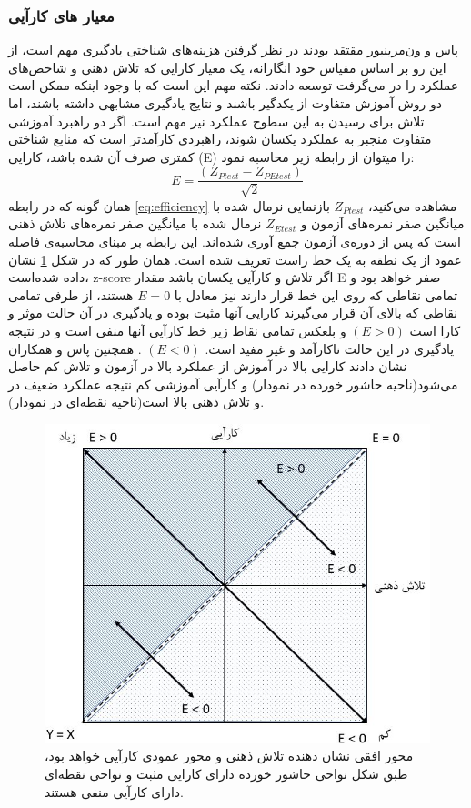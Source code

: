 \subsubsection{معیار های کارآیی}
پاس و ون‌مرینبور مقتقد بودند در نظر گرفتن هزینه‌های شناختی یادگیری مهم است، از این رو بر اساس مقیاس خود انگارانه، یک معیار کارایی که تلاش ذهنی و شاخص‌های عملکرد را در می‌گرفت توسعه دادند. نکته مهم این است که با وجود اینکه ممکن است دو روش آموزش متفاوت از یکدگیر باشند و نتایج یادگیری مشابهی داشته باشند، اما تلاش برای رسیدن به این سطوح عملکرد نیز مهم است. اگر دو راهبرد آموزشی متفاوت منجبر به عملکرد یکسان شوند، راهبردی کارآمدتر است که منابع شناختی کمتری صرف آن شده باشد، کارایی (E) را میتوان از رابطه زیر محاسبه نمود:
\begin{equation}\label{eq:efficiency}
E = \frac{(Z_{Ptest}-Z_{PEtest})}{\sqrt{2}}
\end{equation}
همان گونه که در رابطه 
\eqref{eq:efficiency}
مشاهده می‌کنید،
$ Z_{Ptest} $
بازنمایی نرمال شده با میانگین صفر
نمره‌های آزمون و 
$ Z_{Etest} $
نرمال شده با میانگین صفر نمره‌های تلاش ذهنی است که پس از دوره‌ی آزمون جمع آوری شده‌اند. این رابطه بر مبنای محاسبه‌ی فاصله عمود از یک نطقه به یک خط راست تعریف شده است. همان طور که در شکل 
\ref{fig:efficiency}
نشان داده شده‌است،
z-score
اگر تلاش و کارآیی یکسان باشد مقدار E صفر خواهد بود و تمامی نقاطی که روی این خط قرار دارند نیز معادل با 
$ E = 0 $
هستند، از طرفی تمامی نقاطی که بالای آن قرار می‌گیرند کارایی آنها مثبت بوده و یادگیری در آن حالت موثر و کارا است 
$ (E > 0) $
و بلعکس تمامی نقاط زیر خط کارآیی آنها منفی است و در نتیجه یادگیری در این حالت ناکارآمد و غیر مفید است.
$ (E < 0) $
.
\cite{paas1993efficiency}
همچنین پاس و همکاران نشان دادند کارایی بالا در آموزش از عملکرد بالا در آزمون و تلاش کم حاصل می‌شود(ناحیه حاشور خورده در نمودار) و کارآیی آموزشی کم نتیجه عملکرد ضعیف در و تلاش ذهنی بالا است(ناحیه نقطه‌ای در نمودار).
\cite{paas2003cognitive}
\\

\begin{figure}[htbp]
	\centering
	\includegraphics[width=0.7\linewidth]{figures/efficiency}
	\caption[بازنمایی گرافیکی کارآیی]{محور افقی نشان دهنده تلاش ذهنی و محور عمودی کارآیی خواهد بود، طبق شکل نواحی حاشور خورده دارای کارایی مثبت و نواحی نقطه‌ای دارای کارآیی منفی هستند.}
	\label{fig:efficiency}
\end{figure}

